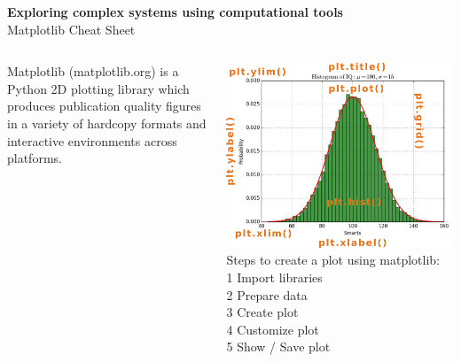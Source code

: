 \documentclass[x11names,svgnames,11pt]{beamer}
\begin{document}

\begin{frame}[plain,fragile]%
	
	\textbf{\color{myblue} Exploring complex systems using computational tools}\\
	Matplotlib Cheat Sheet\\
	
	\begin{columns}
			\begin{tcolorbox}[title=Matplotlib]
		 		Matplotlib (matplotlib.org) is a Python 2D plotting library which produces publication
				 quality figures  in a variety of hardcopy formats and interactive environments across
				 platforms. 
			\end{tcolorbox}
		
			\begin{tcolorbox}[title=Workflow]
				\begin{columns}
						\includegraphics[width=1.\linewidth]{./histogram_labels.png}
						Steps to create a plot using matplotlib:\\
						{\color{sharky_main}\small 1} Import libraries\\ 
						{\color{sharky_main}\small 2} Prepare data\\
						{\color{sharky_main}\small 3} Create plot\\
						{\color{sharky_main}\small 4} Customize plot\\
						{\color{sharky_main}\small 5} Show / Save plot\\
				\end{columns}
			\end{tcolorbox}
			

\end{columns}
\end{frame}
\end{document}
